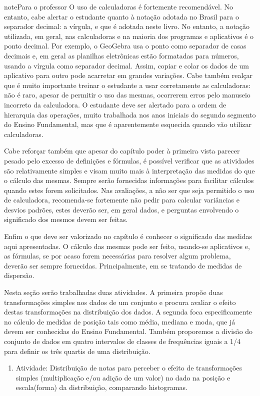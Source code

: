 \begin{sphinxadmonition}{note}{Para o professor}
O uso de calculadoras é fortemente recomendável. No entanto, cabe alertar o estudante quanto à notação adotada no Brasil para o separador decimal: a vírgula, e que é adotada neste livro. No entanto, a notação utilizada, em geral, nas calculadoras e na maioria dos programas e aplicativos é o ponto decimal. Por exemplo, o GeoGebra usa o ponto como separador de casas decimais e, em geral as planilhas eletrônicas estão formatadas para números, usando a vírgula como separador decimal. Assim, copiar e colar os dados de um aplicativo para outro pode acarretar em grandes variações. Cabe também realçar que é muito importante treinar o estudante a usar corretamente as calculadoras: não é raro, apesar de permitir o uso das mesmas, ocorrerem erros pelo manuseio incorreto da calculadora. O estudante deve ser alertado para a ordem de hierarquia das operações, muito trabalhada nos anos iniciais do segundo segmento do Ensino Fundamental, mas que é aparentemente esquecida quando vão utilizar calculadoras.

Cabe reforçar também que apesar do capítulo poder à primeira vista parecer pesado pelo excesso de definições e fórmulas, é possível verificar que as atividades são relativamente simples e visam muito mais à interpretação das medidas do que o cálculo das mesmas. Sempre serão fornecidas informações para facilitar cálculos quando estes forem solicitados. Nas avaliações, a não ser que seja permitido o uso de calculadora, recomenda-se fortemente não pedir para calcular variâncias e desvios padrões, estes deverão ser, em geral  dados, e perguntas envolvendo o significado dos mesmos devem ser feitas.

Enfim o que deve ser valorizado no capítulo é conhecer o significado das medidas aqui apresentadas. O cálculo das mesmas pode ser feito, usando-se aplicativos e, as fórmulas, se por acaso forem necessárias para resolver algum problema, deverão ser sempre fornecidas. Principalmente, em se tratando de medidas de dispersão.


 Nesta seção serão trabalhadas duas atividades. A primeira propõe duas transformações simples nos dados de um conjunto e procura avaliar o efeito destas transformações na distribuição dos dados. A segunda foca especificamente no cálculo de medidas de posição tais como média, mediana e moda, que já devem ser conhecidas do Ensino Fundamental. Também proporemos a divisão do conjunto de dados em quatro intervalos de classes de frequências iguais a 1/4 para definir os três quartis de uma distribuição.
\begin{enumerate}
\item {} 
Atividade: Distribuição de notas para perceber o efeito de transformações simples (multiplicação e/ou adição de um valor) no dado na posição e escala(forma) da distribuição, comparando histogramas.


\end{enumerate}
\end{sphinxadmonition}
